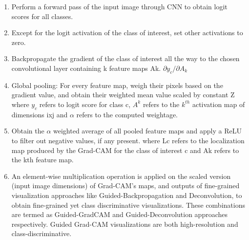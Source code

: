 \documentclass[../report.tex]{subfiles}
\begin{document}
\begin{enumerate}
	\item Perform a forward pass of the input image through CNN to obtain logit scores for all classes.
	\item  Except for the logit activation of the class of interest, set other activations to zero.
	\item Backpropagate the gradient of the class of interest all the way to the chosen convolutional layer containing k feature maps Ak. $\partial y_c /\partial A_k$
	\item Global pooling: For every feature map, weigh their pixels based on the gradient value, and obtain their weighted mean value scaled by constant Z
	where $y_c$ refers to logit score for class c, $A^k$ refers to the $k^{th}$ activation map of dimensions ixj and $\alpha$ refers to the computed weightage.
	\item Obtain the $\alpha$ weighted average of all pooled feature maps and apply a ReLU to filter out negative values, if any present.
	where Lc refers to the localization map produced by the Grad-CAM for the class of interest c and Ak refers to the kth feature map.
	\item An element-wise multiplication operation is applied on the scaled version (input image dimensions) of Grad-CAM’s maps, and outputs of fine-grained visualization approaches like Guided-Backpropagation and Deconvolution, to obtain fine-grained yet class discriminative visualizations. These combinations are termed as Guided-GradCAM and Guided-Deconvolution approaches respectively. Guided Grad-CAM visualizations are both high-resolution and class-discriminative.
\end{enumerate}
	
\end{document}
